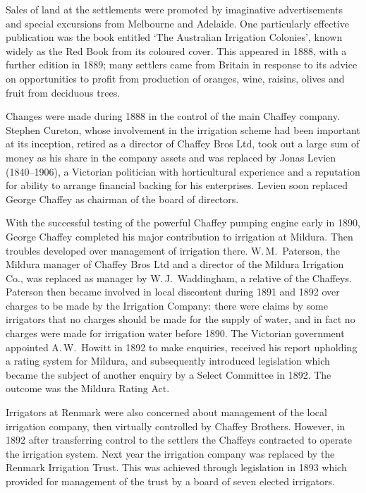 Sales of land at the settlements were promoted by imaginative
advertisements and special excursions from Melbourne and Adelaide.
One particularly effective publication was the book entitled `The
Australian Irrigation Colonies', known widely as the Red Book from its
coloured cover.  This appeared in 1888, with a further edition in
1889; many settlers came from Britain in response to its advice on
opportunities to profit from production of oranges, wine, raisins,
olives and fruit from deciduous trees.

Changes were made during 1888 in the control of the main Chaffey
company.  Stephen Cureton, whose involvement in the irrigation scheme
had been important at its inception, retired as a director of Chaffey
Bros Ltd, took out a large sum of money as his share in the company
assets and was replaced by Jonas Levien (1840--1906), a Victorian
politician with horticultural experience and a reputation for ability
to arrange financial backing for his enterprises.  Levien soon
replaced George Chaffey as chairman of the board of directors.

With the successful testing of the powerful Chaffey pumping engine
early in 1890, George Chaffey completed his major contribution to
irrigation at Mildura.  Then troubles developed over management of
irrigation there.  W.\,M.~Paterson, the Mildura manager of Chaffey
Bros Ltd and a director of the Mildura Irrigation Co., was replaced as
manager by W.\,J.~Waddingham, a relative of the Chaffeys.  Paterson
then became involved in local discontent during 1891 and 1892 over
charges to be made by the Irrigation Company: there were claims by
some irrigators that no charges should be made for the supply of
water, and in fact no charges were made for irrigation water before
1890.  The Victorian government appointed A.\,W.~Howitt in 1892 to
make enquiries, received his report upholding a rating system for
Mildura, and subsequently introduced legislation which became the
subject of another enquiry by a Select Committee in 1892.  The outcome
was the Mildura Rating Act.

Irrigators at Renmark were also concerned about management of the
local irrigation company, then virtually controlled by Chaffey
Brothers.  However, in 1892 after transferring control to the settlers
the Chaffeys contracted to operate the irrigation system.  Next year
the irrigation company was replaced by the Renmark Irrigation Trust.
This was achieved through legislation in 1893 which provided for
management of the trust by a board of seven elected
irrigators.

